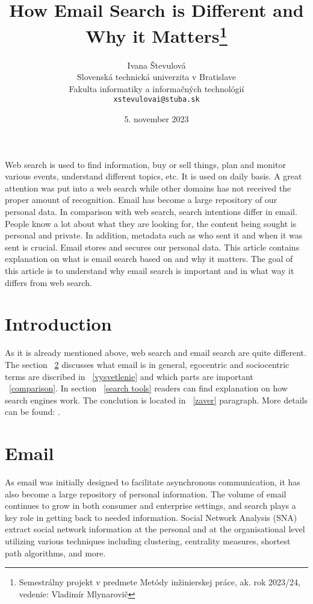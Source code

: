 \documentclass[10pt,twoside,english,a4paper]{article}
\title{ How Email Search is Different and Why it Matters\thanks{Semestrálny projekt v predmete Metódy inžinierskej práce, ak. rok 2023/24, vedenie: Vladimír Mlynarovič}} %
\author{Ivana Števulová\\[2pt]
	{\small Slovenská technická univerzita v Bratislave}\\
	{\small Fakulta informatiky a informačných technológií}\\
	{\small \texttt{xstevulovai@stuba.sk}}
	}
\date{\small 5. november 2023}%
\begin{document}
\maketitle

\begin{abstract}

\end{abstract}

Web search is used to find information, buy or sell things, plan and monitor various events, understand different topics, etc. It is used on daily basis. A great attention was put into a web search while other domains has not received the proper amount of recognition. Email has become a large repository of our personal data. In comparison with web search, search intentions differ in email. People know a lot about what they are looking for, the content being sought is personal and private. In addition, metadata such as who sent it and when it was sent is crucial. Email stores and secures our personal data. This article contains explanation on what is email search based on and why it matters. The goal of this article is to understand why email search is important and in what way it differs from web search.


\section{Introduction}

	As it is already mentioned above, web search and email search are quite different. The section ~\ref{email} discusses what email is in general, egocentric and sociocentric terms are discribed in ~\ref{vysvetlenie} and which parts are important  ~\ref{comparison}. In section ~\ref{search tools} readers can find explanation on how search engines work.
The conclution is located in ~\ref{zaver} paragraph.
More details can be found: \cite{source}.


\section{Email} \label{email}
As email was initially designed to facilitate asynchronous communication, it has also become a large repository of personal information. The volume of email continues to grow in both consumer and enterprise settings, and search plays a key role in getting back to needed information. Social Network Analysis (SNA) extract social network information at the personal and at the organisational level utilizing various techniques including clustering, centrality measures, shortest path algorithms, and more.
\end{document}
